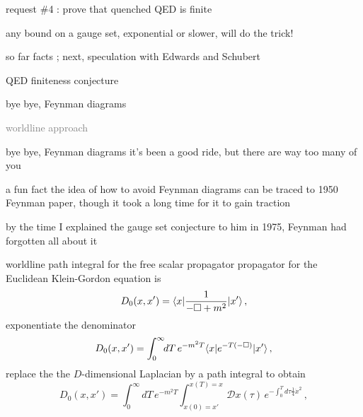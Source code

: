 \begin{frame}{request \#4 : prove that quenched QED is finite}
\begin{center}
{\huge any bound on a gauge set, exponential or slower, will do the trick!}
\end{center}
\end{frame}

\begin{frame}{so far facts ; next, speculation with Edwards and Schubert}
\begin{enumerate}
              \item
QED finiteness conjecture
              \item {\Large
bye bye, Feynman diagrams
                  }\textcolor{gray}{\small
              \item
worldline approach
                    }
\end{enumerate}
\end{frame}


\begin{frame}{bye bye, Feynman diagrams}
it's been a good ride, but there are way too many of you
\end{frame}

\begin{frame}{a fun fact}
the idea of how to avoid Feynman diagrams can be traced to 1950 Feynman
paper, though it took a long time for it to gain
traction

\bigskip

by the time I explained the gauge set conjecture to
him in 1975, Feynman had forgotten all about it
\end{frame}

\begin{frame}{worldline path integral for the free scalar propagator}
propagator for the Euclidean
Klein-Gordon equation is
\[ %
D_0(x,x')=\bra{x}\frac{1}{-\Box +m^2}\ket{x'}
\,,
\] %
exponentiate the
denominator
\[ %
D_0(x,x')=\int_0^\infty\!\!dT\,{e}^{-m^2T}\bra{x}e^{-T(-\Box)}\ket{x'}
\,,
\] %
replace the the $D$-dimensional Laplacian by a path integral
to obtain
\[ %
D_0(x,x')=\int_0^\infty\!\!dT\,e^{-m^2T}
\int_{x(0)=x'}^{x(T)=x}\!\!\!\!\mathcal{D}x(\tau)\,
    e^{-\int_0^T\!\!d\tau \frac{1}{4}\dot{x}^2}
\,,
\] %
\end{frame}

